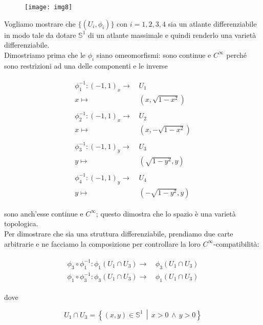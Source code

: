 \begin{figure}[H]
\centering
\texttt{[image: img8]}
\end{figure}

Vogliamo mostrare che $ \{(U_{i},\phi_{i})\} $ con $ i=1,2,3,4 $ sia un atlante differenziabile in modo tale da dotare $ \mathbb{S}^{1} $ di un atlante massimale e quindi renderlo una varietà differenziabile.\\
Dimostriamo prima che le $ \phi_{i} $ siano omeomorfismi: sono continue e $ C^{\infty} $ perché sono restrizioni ad una delle componenti e le inverse

\begin{align}
	\begin{split}
		\phi_{1}^{-1} : (-1,1)_{x} \to& \, U_{1}\\
		x \mapsto& \, (x,\sqrt{1-x^{2}})\\\\
		\phi_{2}^{-1} : (-1,1)_{x} \to& \, U_{2}\\
		x \mapsto& \, (x,-\sqrt{1-x^{2}})\\\\
		\phi_{3}^{-1} : (-1,1)_{y} \to& \, U_{3}\\
		y \mapsto& \, (\sqrt{1-y^{2}},y)\\\\
		\phi_{4}^{-1} : (-1,1)_{y} \to& \, U_{4}\\
		y \mapsto& \, (-\sqrt{1-y^{2}},y)
	\end{split}
\end{align}

sono anch'esse continue e $ C^{\infty} $; questo dimostra che lo spazio è una varietà topologica.\\
Per dimostrare che sia una struttura differenziabile, prendiamo due carte arbitrarie e ne facciamo la composizione per controllare la loro $ C^{\infty} $-compatibilità:

\begin{align}
	\begin{split}
		\phi_{3} \circ \phi_{1}^{-1} : \phi_{1}(U_{1} \cap U_{3}) \to& \, \phi_{3}(U_{1} \cap U_{3})\\
		\phi_{1} \circ \phi_{3}^{-1} : \phi_{3}(U_{1} \cap U_{3}) \to& \, \phi_{1}(U_{1} \cap U_{3})
	\end{split}
\end{align}

dove

\begin{equation}
	U_{1} \cap U_{3} = \left\{ (x,y) \in \mathbb{S}^{1} \, \middle| \, x>0 \, \wedge \, y>0  \right\}
\end{equation}

